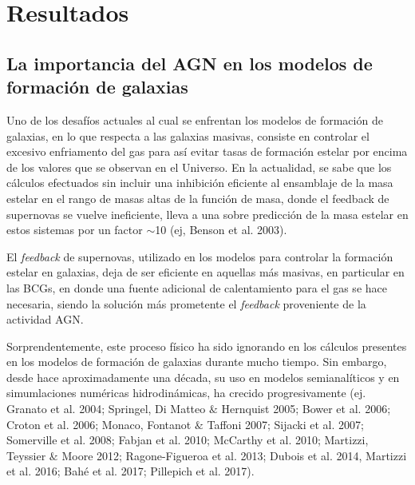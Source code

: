 
\chapter{Resultados} %

\label{ch:resultados} %



\section{La importancia del AGN en los modelos de formaci\'on de galaxias}
Uno de los desaf\'ios actuales al cual se enfrentan los modelos de formaci\'on de galaxias, en lo que 
respecta a las galaxias masivas, consiste en controlar el excesivo enfriamento del gas para as\'i evitar tasas 
de formaci\'on estelar por encima de los valores que se observan en el Universo. En la actualidad, se sabe que los 
c\'alculos efectuados sin incluir una inhibici\'on eficiente al ensamblaje de la masa estelar en el rango de masas altas 
de la funci\'on de masa, donde el feedback de supernovas se vuelve ineficiente, lleva a una sobre predicci\'on de la masa 
estelar en estos sistemas por un factor $\sim$10 (ej, Benson et al. 2003).

El {\it feedback} de supernovas, utilizado en los modelos para controlar la formaci\'on estelar en galaxias,
deja de ser eficiente en aquellas m\'as masivas, en particular en las BCGs, en donde una fuente adicional de calentamiento 
para el gas se hace necesaria, siendo la soluci\'on m\'as prometente el {\it feedback} proveniente de la actividad AGN.

Sorprendentemente, este proceso f\'isico ha sido ignorando en los c\'alculos presentes en los modelos de formaci\'on de galaxias durante
mucho tiempo. Sin embargo, desde hace aproximadamente una d\'ecada, su uso en modelos semianal\'iticos 
y en simumlaciones num\'ericas hidrodin\'amicas, ha crecido progresivamente 
(ej. Granato et al. 2004; Springel, Di Matteo $\&$ Hernquist 2005; Bower et al. 2006; Croton et al. 2006; Monaco,
Fontanot $\&$ Taffoni 2007; Sijacki et al. 2007; Somerville et al. 2008; Fabjan et al. 2010; McCarthy et al. 2010;
Martizzi, Teyssier $\&$ Moore 2012; Ragone-Figueroa et al. 2013; Dubois et al. 2014, Martizzi et al. 2016; Bah\'e et al. 2017;
Pillepich et al. 2017).

